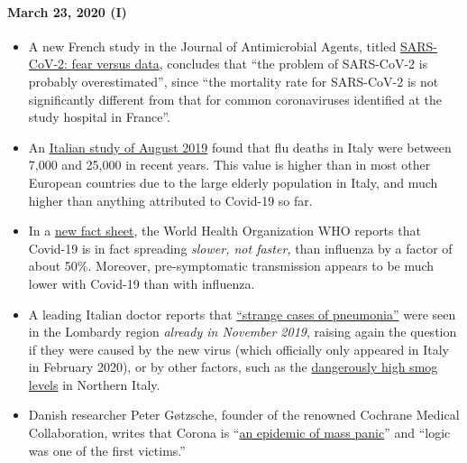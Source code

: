 \hypertarget{march-23-2020-i}{%
\paragraph{March 23, 2020 (I)}\label{march-23-2020-i}}

\begin{itemize}
\tightlist
\item
  A new French study in the Journal of Antimicrobial Agents, titled
  \href{https://www.sciencedirect.com/science/article/abs/pii/S0924857920300972}{SARS-CoV-2:
  fear versus data}, concludes that ``the problem of SARS-CoV-2 is
  probably overestimated'', since ``the mortality rate for SARS-CoV-2 is
  not significantly different from that for common coronaviruses
  identified at the study hospital in France''.
\item
  An
  \href{https://www.ijidonline.com/article/S1201-9712(19)30328-5/fulltext}{Italian
  study of August 2019} found that flu deaths in Italy were between
  7,000 and 25,000 in recent years. This value is higher than in most
  other European countries due to the large elderly population in Italy,
  and much higher than anything attributed to Covid-19 so far.
\item
  In a
  \href{https://www.who.int/news-room/q-a-detail/q-a-similarities-and-differences-covid-19-and-influenza}{new
  fact sheet}, the World Health Organization WHO reports that Covid-19
  is in fact spreading \emph{slower, not faster,} than influenza by a
  factor of about 50\%. Moreover, pre-symptomatic transmission appears
  to be much lower with Covid-19 than with influenza.
\item
  A leading Italian doctor reports that
  \href{https://www.scmp.com/news/china/society/article/3076334/coronavirus-strange-pneumonia-seen-lombardy-november-leading}{``strange
  cases of pneumonia''} were seen in the Lombardy region \emph{already
  in November 2019}, raising again the question if they were caused by
  the new virus (which officially only appeared in Italy in February
  2020), or by other factors, such as the
  \href{https://www.thelocal.it/20170131/our-lungs-are-breaking-smog-levels-way-above-safe-limits-in-northern-italy}{dangerously
  high smog levels} in Northern Italy.
\item
  Danish researcher Peter Gøtzsche, founder of the renowned Cochrane
  Medical Collaboration, writes that Corona is
  ``\href{https://www.deadlymedicines.dk/corona-an-epidemic-of-mass-panic/}{an
  epidemic of mass panic}'' and ``logic was one of the first victims.''
\end{itemize}

